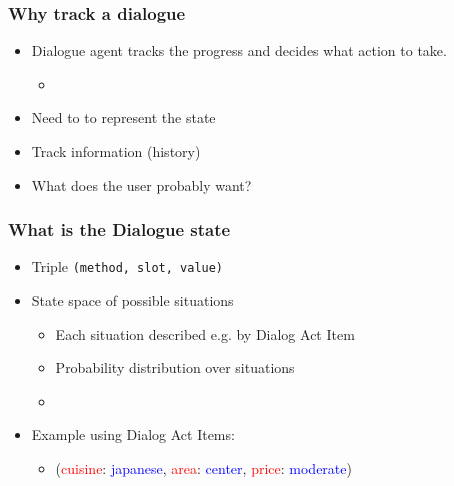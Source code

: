 \begin{frame}
\frametitle{Why track a dialogue}
\begin{itemize}[<+->]
\item Dialogue agent tracks the progress and decides what action to take.
\begin{itemize}
\item {}
\end{itemize}
\item Need to to represent the state 
\item Track  information (history)
\item \alert{What does the user probably want?} 
\end{itemize}
\end{frame}

\begin{frame}
\frametitle{What is the Dialogue state}

\begin{itemize}[<+->]
\item Triple \texttt{(method, slot, value)}
\item State space of possible situations
\begin{itemize}
\item Each situation described e.g. by Dialog Act Item
\item Probability distribution over situations
\item {}
\end{itemize}
\item Example using Dialog Act Items:
	\begin{itemize}
	\item (\textcolor{red}{cuisine}: \textcolor{blue}{japanese}, \textcolor{red}{area}: \textcolor{blue}{center}, \textcolor{red}{price}: \textcolor{blue}{moderate})
	\end{itemize}
\end{itemize}
\end{frame}


